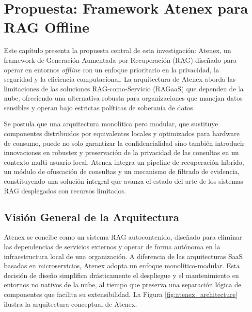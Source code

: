 \chapter{Propuesta: Framework Atenex para RAG Offline}\label{chap:proposal}

\noindent
Este capítulo presenta la propuesta central de esta investigación: Atenex, un framework de Generación Aumentada por Recuperación (RAG) diseñado para operar en entornos \emph{offline} con un enfoque prioritario en la privacidad, la seguridad y la eficiencia computacional. La arquitectura de Atenex aborda las limitaciones de las soluciones RAG-como-Servicio (RAGaaS) que dependen de la nube, ofreciendo una alternativa robusta para organizaciones que manejan datos sensibles y operan bajo estrictas políticas de soberanía de datos.

Se postula que una arquitectura monolítica pero modular, que sustituye componentes distribuidos por equivalentes locales y optimizados para hardware de consumo, puede no solo garantizar la confidencialidad sino también introducir innovaciones en robustez y preservación de la privacidad de las consultas en un contexto multi-usuario local. Atenex integra un pipeline de recuperación híbrido, un módulo de ofuscación de consultas y un mecanismo de filtrado de evidencia, constituyendo una solución integral que avanza el estado del arte de los sistemas RAG desplegados con recursos limitados.

\section{Visión General de la Arquitectura}

Atenex se concibe como un sistema RAG autocontenido, diseñado para eliminar las dependencias de servicios externos y operar de forma autónoma en la infraestructura local de una organización. A diferencia de las arquitecturas SaaS basadas en microservicios, Atenex adopta un enfoque monolítico-modular. Esta decisión de diseño simplifica drásticamente el despliegue y el mantenimiento en entornos no nativos de la nube, al tiempo que preserva una separación lógica de componentes que facilita su extensibilidad. La Figura \ref{fig:atenex_architecture} ilustra la arquitectura conceptual de Atenex.

